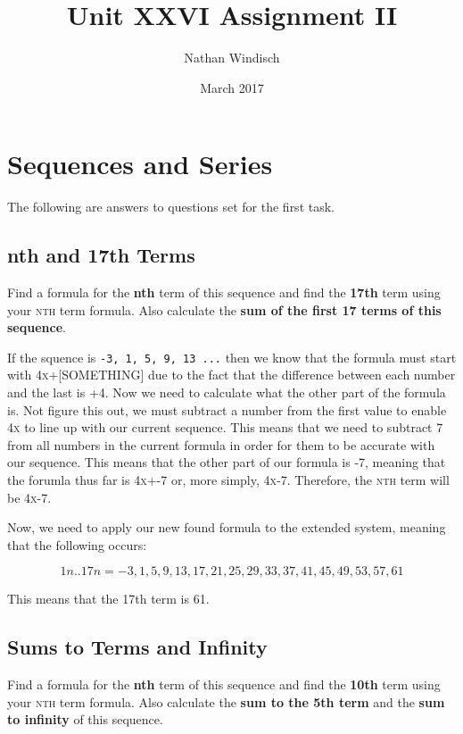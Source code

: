 \documentclass[a4paper,12pt]{article}
\begin{document}
\title{Unit XXVI Assignment II}
\author{Nathan Windisch}
\date{March 2017}
\maketitle
{}
\tableofcontents
\newpage
{}

\section{Sequences and Series}
The following are answers to questions set for the first task.
\subsection{nth and 17th Terms}
Find a formula for the \textbf{nth} term of this sequence and find the \textbf{17th} term using your \textsc{nth} term formula. Also calculate the \textbf{sum of the first 17 terms of this sequence}.

If the squence is \texttt{-3, 1, 5, 9, 13 ...} then we know that the formula must start with \textsc{4x+[SOMETHING]} due to the fact that the difference between each number and the last is +4. Now we need to calculate what the other part of the formula is. Not figure this out, we must subtract a number from the first value to enable \textsc{4x} to line up with our current sequence. This means that we need to subtract \textsc{7} from all numbers in the current formula in order for them to be accurate with our sequence. This means that the other part of our formula is \textsc{-7}, meaning that the forumla thus far is \textsc{4x+-7} or, more simply, \textsc{4x-7}. Therefore, the \textsc{nth} term will be \textsc{4x-7}.

Now, we need to apply our new found formula to the extended system, meaning that the following occurs:

\[
  {1n..17n = -3, 1, 5, 9, 13, 17, 21, 25, 29, 33, 37, 41, 45, 49, 53, 57, 61}
\]

This means that the 17th term is \textsc{61}.

\newpage

\subsection{Sums to Terms and Infinity}
Find a formula for the \textbf{nth} term of this sequence and find the \textbf{10th} term using your \textsc{nth} term formula. Also calculate the \textbf{sum to the 5th term} and the \textbf{sum to infinity} of this sequence.
\end{document}
